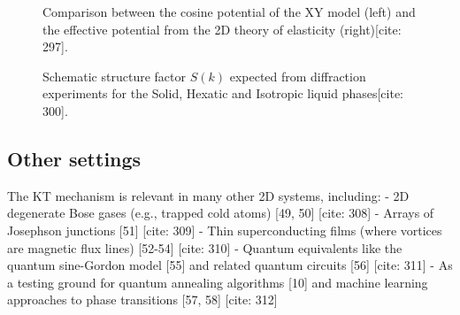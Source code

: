 \documentclass[11pt]{article}
\begin{document}
\begin{figure}[h!]
    \centering
    \caption{Comparison between the cosine potential of the XY model (left) and the effective potential from the 2D theory of elasticity (right)[cite: 297].}
    \label{fig:potentials}
\end{figure}

\begin{figure}[h!]
    \centering
    \caption{Schematic structure factor $S(k)$ expected from diffraction experiments for the Solid, Hexatic and Isotropic liquid phases[cite: 300].}
    \label{fig:diffraction}
\end{figure}

\subsection{Other settings}

The KT mechanism is relevant in many other 2D systems, including:
-   2D degenerate Bose gases (e.g., trapped cold atoms) [49, 50] [cite: 308]
-   Arrays of Josephson junctions [51] [cite: 309]
-   Thin superconducting films (where vortices are magnetic flux lines) [52-54] [cite: 310]
-   Quantum equivalents like the quantum sine-Gordon model [55] and related quantum circuits [56] [cite: 311]
-   As a testing ground for quantum annealing algorithms [10] and machine learning approaches to phase transitions [57, 58] [cite: 312]
\end{document}
